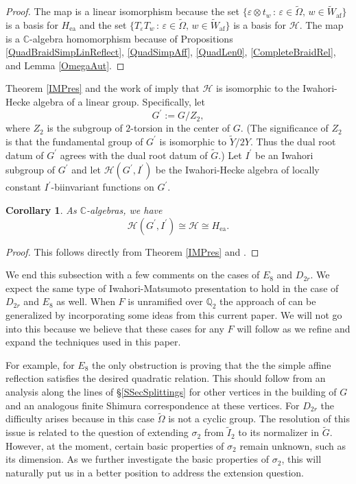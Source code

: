\documentclass[10pt, letterpaper]{amsart}
\theoremstyle{plain}
\newtheorem{Cor}[equation]{Corollary}
\theoremstyle{definition}
\numberwithin{equation}{section}
\newcommand{\Gt}{\widetilde{G}}
\newcommand{\It}{\widetilde{I}}
\newcommand{\Yt}{\widetilde{Y}}
\newcommand{\Wt}{\widetilde{W}}
\newcommand{\Omegat}{\widetilde{\Omega}}
\newcommand{\af}{\mathrm{af}}
\newcommand{\ea}{\mathrm{ea}}
\newcommand{\Hcal}{\mathcal{H}}
\newcommand{\st}{\,:\,}
\begin{document}
        \begin{proof}
            The map is a linear isomorphism because the set $\{\varepsilon\otimes t_{w}\st\varepsilon\in\Omegat,\,w\in\Wt_{\af}\}$ is a basis for $H_{\ea}$ and the set $\{T_{\varepsilon}T_{w}\st\varepsilon\in \Omegat,\,w\in\Wt_{\af}\}$ is a basis for $\Hcal$. The map is a $\mathbb{C}$-algebra homomorphism because of Propositions \ref{QuadBraidSimpLinReflect}, \ref{QuadSimpAff}, \ref{QuadLen0}, \ref{CompleteBraidRel}, and Lemma \ref{OmegaAut}.
        \end{proof}

        Theorem \ref{IMPres} and the work of \cite{IM} imply that $\Hcal$ is isomorphic to the Iwahori-Hecke algebra of a linear group. Specifically, let 
        \[
        G^{\prime}:=G/Z_{2},
        \]
        where $Z_{2}$ is the subgroup of $2$-torsion in the center of $G$. (The significance of $Z_{2}$ is that the fundamental group of $G^{\prime}$ is isomorphic to $\Yt/2Y$. Thus the dual root datum of $G^{\prime}$ agrees with the dual root datum of $\Gt$.) Let $I^{\prime}$ be an Iwahori subgroup of $G^{\prime}$ and let $\Hcal(G^{\prime},I^{\prime})$ be the Iwahori-Hecke algebra of locally constant $I^{\prime}$-biinvariant functions on $G^{\prime}$.

        \begin{Cor}\label{HeckeShimCorr}
            As $\mathbb{C}$-algebras, we have
            \[
            \Hcal(G^{\prime},I^{\prime})\cong\Hcal\cong H_{\ea}.
            \]
        \end{Cor}

        \begin{proof}
            This follows directly from Theorem \ref{IMPres} and \cite[Section 3]{IM}. 
        \end{proof}
	
We end this subsection with a few comments on the cases of $E_{8}$ and $D_{2r}$. We expect the same type of Iwahori-Matsumoto presentation to hold in the case of $D_{2r}$ and $E_{8}$ as well. When $F$ is unramified over $\mathbb{Q}_{2}$ the approach of \cite{Karasiewicz} can be generalized by incorporating some ideas from this current paper. We will not go into this because we believe that these cases for any $F$ will follow as we refine and expand the techniques used in this paper. 

For example, for $E_{8}$ the only obstruction is proving that the the simple affine reflection satisfies the desired quadratic relation. This should follow from an analysis along the lines of \S \ref{SSecSplittings} for other vertices in the building of $G$ and an analogous finite Shimura correspondence at these vertices. For $D_{2r}$ the difficulty arises because in this case $\Omegat$ is not a cyclic group. The resolution of this issue is related to the question of extending $\sigma_{2}$ from $\It_2$ to its normalizer in $\Gt$. However, at the moment, certain basic properties of $\sigma_{2}$ remain unknown, such as its dimension. As we further investigate the basic properties of $\sigma_{2}$, this will naturally put us in a better position to address the extension question.
\end{document}
